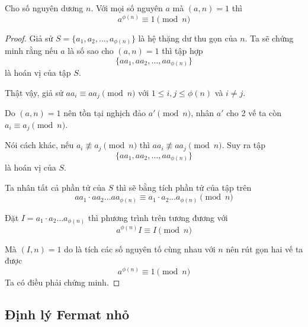 \documentclass{mynotes}
\begin{document}
\begin{theorem}    
    Cho số nguyên dương $n$. Với mọi số nguyên $a$ mà $(a, n) = 1$ thì 
    \begin{equation}
        a^{\phi(n)} \equiv 1 \pmod n
    \end{equation}
\end{theorem}

\begin{proof}
    Giả sử $S = \{a_1, a_2, \ldots, a_{\phi(n)}\}$ là hệ thặng dư thu gọn của $n$. Ta sẽ chứng minh rằng nếu $a$ là số sao cho $(a, n)=1$ thì tập hợp
    \begin{equation*}
        \{a a_1, a a_2, \ldots, a a_{\phi(n)}\}
    \end{equation*}
    là hoán vị của tập $S$.

    Thật vậy, giả sử $a a_i \equiv a a_j \pmod n$ với $1 \leqslant i, j \leqslant \phi(n)$ và $i \neq j$.

    Do $(a, n) = 1$ nên tồn tại nghịch đảo $a' \pmod n$, nhân $a'$ cho 2 vế ta còn $a_i \equiv a_j \pmod n$.

    Nói cách khác, nếu $a_i \not\equiv a_j \pmod n$ thì $a a_i \not\equiv a a_j \pmod n$. Suy ra tập
    \begin{equation*}
        \{a a_1, a a_2, \ldots, a a_{\phi(n)}\}
    \end{equation*}
    là hoán vị của $S$.

    Ta nhân tất cả phần tử của $S$ thì sẽ bằng tích phần tử của tập trên
    \begin{equation*}
        a a_1 \cdot a a_2 \ldots a a_{\phi(n)} \equiv a_1 \cdot a_2 \ldots a_{\phi(n)} \pmod n
    \end{equation*}

    Đặt $I = a_1 \cdot a_2 \ldots a_{\phi(n)}$ thì phương trình trên tương đương với 
    \begin{equation*}
        a^{\phi(n)} I \equiv I \pmod n
    \end{equation*}
    
    Mà $(I, n) = 1$ do là tích các số nguyên tố cùng nhau với $n$ nên rút gọn hai vế ta được
    \begin{equation*}
        a^{\phi(n)} \equiv 1 \pmod n
    \end{equation*}
    Ta có điều phải chứng minh.
\end{proof}

\subsection*{Định lý Fermat nhỏ}
\end{document}
